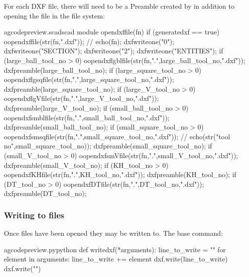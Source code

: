 \documentclass{ltxdoc}
\begin{document}
For each DXF file, there will need to be a Preamble created by 
in addition to opening the file in the file system:

\lstset{firstnumber=\thegcpscad}
\begin{writecode}{a}{gcodepreview.scad}{scad}
module opendxffile(fn) {
  if (generatedxf == true) {
      oopendxffile(str(fn,".dxf"));
//    echo(fn);
      dxfwriteone("0");
      dxfwriteone("SECTION");
      dxfwriteone("2");
      dxfwriteone("ENTITIES");
    if (large_ball_tool_no >  0) {    oopendxflgblfile(str(fn,".",large_ball_tool_no,".dxf"));
      dxfpreamble(large_ball_tool_no);
    } 
    if (large_square_tool_no >  0) {    oopendxflgsqfile(str(fn,".",large_square_tool_no,".dxf"));
      dxfpreamble(large_square_tool_no);
    } 
    if (large_V_tool_no >  0) {    oopendxflgVfile(str(fn,".",large_V_tool_no,".dxf"));
      dxfpreamble(large_V_tool_no);
    } 
    if (small_ball_tool_no >  0) { oopendxfsmblfile(str(fn,".",small_ball_tool_no,".dxf"));
      dxfpreamble(small_ball_tool_no);
    } 
    if (small_square_tool_no >  0) {    oopendxfsmsqfile(str(fn,".",small_square_tool_no,".dxf"));
//    echo(str("tool no",small_square_tool_no));
      dxfpreamble(small_square_tool_no);
    } 
    if (small_V_tool_no >  0) {    oopendxfsmVfile(str(fn,".",small_V_tool_no,".dxf"));
      dxfpreamble(small_V_tool_no);
    } 
    if (KH_tool_no >  0) {    oopendxfKHfile(str(fn,".",KH_tool_no,".dxf"));
      dxfpreamble(KH_tool_no);
    } 
    if (DT_tool_no >  0) {    oopendxfDTfile(str(fn,".",DT_tool_no,".dxf"));
      dxfpreamble(DT_tool_no);
    } 
  }
}

\end{writecode}
\addtocounter{gcpscad}{36}

\subsubsection{Writing to files}
 
Once files have been opened they may be written to. The base command: 
 
\lstset{firstnumber=\thegcpy}
\begin{writecode}{a}{gcodepreview.py}{python}
def writedxf(*arguments):
    line_to_write = ""
    for element in arguments:
       line_to_write += element
    dxf.write(line_to_write)
    dxf.write("\n")

\end{writecode}
\addtocounter{gcpy}{7}
\end{document}
